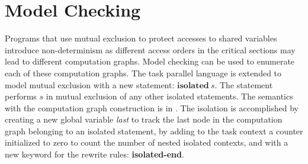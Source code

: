 \section{Model Checking}\label{sec:otf}
Programs that use mutual exclusion to protect accesses to shared variables introduce non-determinism as different access orders in the critical sections may lead to different computation graphs. Model checking can be used to enumerate each of these computation graphs. The task parallel language is extended to model mutual exclusion with a new statement: $\textbf{isolated}~s$.
The statement performs $s$ in mutual exclusion of any other isolated statements. The semantics with the computation graph construction is in . The isolation is accomplished by creating a new global variable \textit{last} to track the last node in the computation graph belonging to an isolated statement, by adding to the task context a counter initialized to zero to count the number of nested isolated contexts, and with a new keyword for the rewrite rules: \textbf{isolated-end}. 

